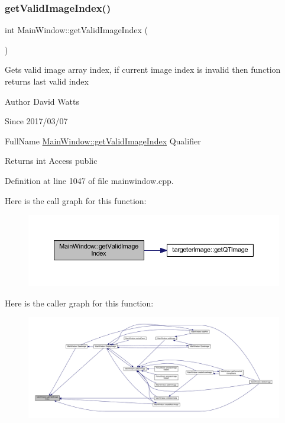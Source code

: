 \subsubsection{\texorpdfstring{get\+Valid\+Image\+Index()}{getValidImageIndex()}}
{\footnotesize\ttfamily int Main\+Window\+::get\+Valid\+Image\+Index (\begin{DoxyParamCaption}{ }\end{DoxyParamCaption})}

Gets valid image array index, if current image index is invalid then function returns last valid index

\begin{DoxyAuthor}{Author}
David Watts 
\end{DoxyAuthor}
\begin{DoxySince}{Since}
2017/03/07
\end{DoxySince}
Full\+Name \hyperlink{class_main_window_acc35ff9a0c04d62297e7fd219fa869e5}{Main\+Window\+::get\+Valid\+Image\+Index} Qualifier \begin{DoxyReturn}{Returns}
int Access public 
\end{DoxyReturn}


Definition at line 1047 of file mainwindow.\+cpp.

Here is the call graph for this function\+:
\nopagebreak
\begin{figure}[H]
\begin{center}
\leavevmode
\includegraphics[width=350pt]{class_main_window_acc35ff9a0c04d62297e7fd219fa869e5_cgraph}
\end{center}
\end{figure}
Here is the caller graph for this function\+:
\nopagebreak
\begin{figure}[H]
\begin{center}
\leavevmode
\includegraphics[width=350pt]{class_main_window_acc35ff9a0c04d62297e7fd219fa869e5_icgraph}
\end{center}
\end{figure}
\mbox{\label{class_main_window_aa08469ed5c8396e60fa44bae6530bcf1}} 
